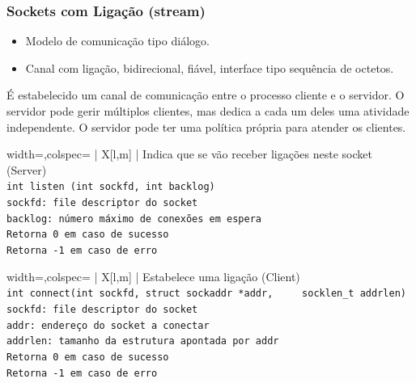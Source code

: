 \documentclass[11pt]{article}
\begin{document}
\subsubsection*{Sockets com Ligação (stream)}

\begin{itemize}
    \item Modelo de comunicação tipo diálogo.
    \item Canal com ligação, bidirecional, fiável, interface tipo sequência de octetos.
\end{itemize}

É estabelecido um canal de comunicação entre o processo cliente e o servidor. O servidor pode gerir múltiplos clientes, mas dedica a cada um deles uma atividade independente. O servidor pode ter uma política própria para atender os clientes.

\begin{tblr}{width=\linewidth,colspec={ | X[l,m] | }}
    \hline
    \centering Indica que se vão receber ligações neste socket (Server) \\\hline
    \lstinline|int listen (int sockfd, int backlog)|                    \\\hline
    \lstinline|sockfd: file descriptor do socket|                       \\
    \lstinline|backlog: número máximo de conexões em espera|            \\\hline
    \lstinline|Retorna 0 em caso de sucesso|                            \\
    \lstinline|Retorna -1 em caso de erro|                              \\\hline
\end{tblr}

\begin{tblr}{width=\linewidth,colspec={ | X[l,m] | }}
    \hline
    \centering Estabelece uma ligação (Client)                  \\\hline
    \lstinline|int connect(int sockfd, struct sockaddr *addr,
    socklen_t addrlen)|                                         \\\hline
    \lstinline|sockfd: file descriptor do socket|               \\
    \lstinline|addr: endereço do socket a conectar|             \\
    \lstinline|addrlen: tamanho da estrutura apontada por addr| \\\hline
    \lstinline|Retorna 0 em caso de sucesso|                    \\
    \lstinline|Retorna -1 em caso de erro|                      \\\hline
\end{tblr}
\end{document}
